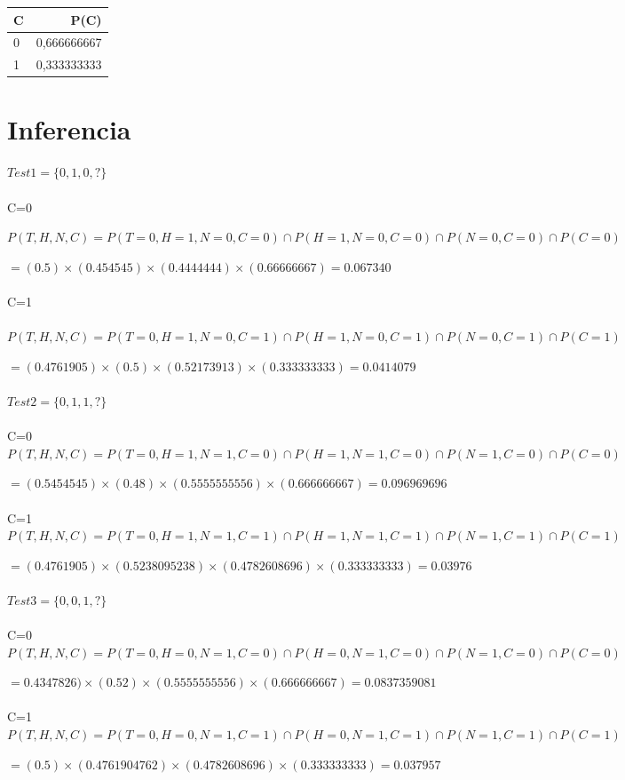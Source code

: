 \documentclass[a4paper]{article}
\begin{document}
\begin{table}[]
\centering
\begin{tabular}{l|r}
C & P(C) \\\hline

0	& 0,666666667\\
1	& 0,333333333
\end{tabular}
\end{table}

\section{Inferencia}

$Test 1=\{0,1,0,?\}$
\\
\\
C=0

$P(T,H,N,C)=P(T=0,H=1,N=0,C=0)\cap P(H=1,N=0,C=0) \cap P(N=0,C=0) \cap P(C=0)$

$=(0.5)\times(0.454545)\times(0.4444444)\times(0.66666667)=0.067340$
\\
\\
C=1
\\
\\
$P(T,H,N,C)=P(T=0,H=1,N=0,C=1)\cap P(H=1,N=0,C=1) \cap P(N=0,C=1) \cap P(C=1)$

$=(0.4761905)\times(0.5)\times(0.52173913)\times(0.333333333)=0.0414079$
\\
\\
$Test 2=\{0,1,1,?\}$
\\
\\
C=0
\\
$P(T,H,N,C)=P(T=0,H=1,N=1,C=0)\cap P(H=1,N=1,C=0) \cap P(N=1,C=0) \cap P(C=0)$

$=(0.5454545)\times(0.48)\times(0.5555555556)\times(0.666666667)=0.096969696$
\\
\\
C=1
\\
$P(T,H,N,C)=P(T=0,H=1,N=1,C=1)\cap P(H=1,N=1,C=1) \cap P(N=1,C=1) \cap P(C=1)$

$=(0.4761905)\times(0.5238095238)\times(0.4782608696)\times(0.333333333)=0.03976$
\\
\\
$Test 3=\{0,0,1,?\}$
\\
\\
C=0
\\
$P(T,H,N,C)=P(T=0,H=0,N=1,C=0)\cap P(H=0,N=1,C=0) \cap P(N=1,C=0) \cap P(C=0)$

$=0.4347826)\times(0.52)\times(0.5555555556)\times(0.666666667)=0.0837359081$
\\
\\
C=1
\\
$P(T,H,N,C)=P(T=0,H=0,N=1,C=1)\cap P(H=0,N=1,C=1) \cap P(N=1,C=1) \cap P(C=1)$

$=(0.5)\times(0.4761904762)\times(0.4782608696)\times(0.333333333)=0.037957$
\end{document}
